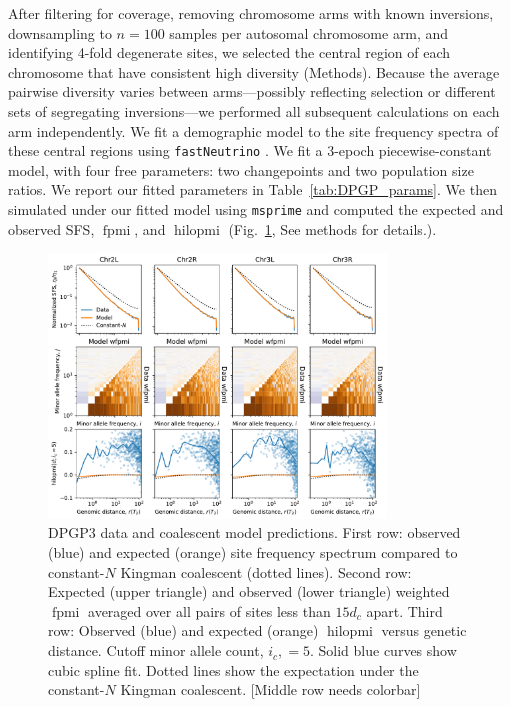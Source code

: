 \documentclass[11pt, letterpaper]{article}   	%
\newcommand{\fig}[1]{Fig.~\ref{#1}}
\DeclareMathOperator{\fpmi}{fpmi}
\DeclareMathOperator{\hilopmi}{hilopmi}
\begin{document}
After filtering for coverage, removing chromosome arms with known inversions, downsampling to $n=100$ samples per autosomal chromosome arm, and identifying 4-fold degenerate sites, we selected the central region of each chromosome that have consistent high diversity (Methods).
Because the average pairwise diversity varies between arms---possibly reflecting selection or different sets of segregating inversions---we performed all subsequent calculations on each arm independently.
We fit a demographic model to the site frequency spectra of these central regions using \texttt{fastNeutrino} \cite{BhaskarEtal2015}.
We fit a 3-epoch piecewise-constant model, with four free parameters: two changepoints and two population size ratios.
We report our fitted parameters in Table~\ref{tab:DPGP_params}.
We then simulated under our fitted model using \texttt{msprime} and computed the expected and observed SFS, $\fpmi$, and $\hilopmi$ (\fig{fig:dpgp3}, See methods for details.).

\begin{figure}
\centering
\includegraphics[width=0.8\textwidth]{figures/figure6.pdf}
\caption{DPGP3 data and coalescent model predictions. First row: observed (blue) and expected (orange) site frequency spectrum compared to constant-$N$ Kingman coalescent (dotted lines). Second row: Expected (upper triangle) and observed (lower triangle) weighted $\fpmi$ averaged over all pairs of sites less than $15 d_c$ apart. Third row: Observed (blue) and expected (orange) $\hilopmi$ versus genetic distance. Cutoff minor allele count, $i_c, = 5$. Solid blue curves show cubic spline fit. Dotted lines show the expectation under the constant-$N$ Kingman coalescent. [Middle row needs colorbar] \label{fig:dpgp3}}
\end{figure}
\end{document}

